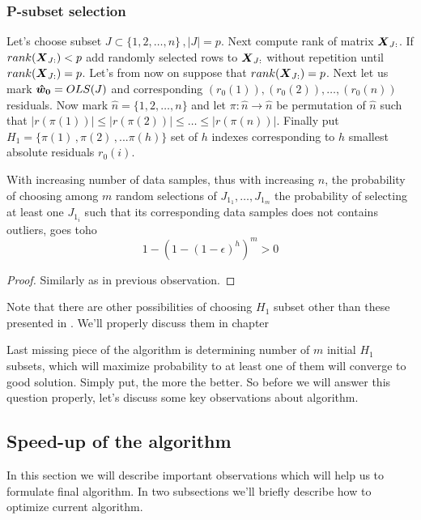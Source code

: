 \subsubsection{P-subset selection}
Let's choose subset $J \subset \{{1,2,\ldots,n\}}\,, |J| = p$. Next compute rank of matrix $\m{X}_{J:}$. If $rank(\m{X}_{J:}) < p$ add randomly selected rows to $\m{X}_{J:}$ without repetition until $rank(\m{X}_{J:}) = p$. Let's from now on suppose that $rank(\m{X}_{J:}) = p$. Next let us mark $\boldsymbol{\hat{w}_0} = OLS(J)$ and corresponding $(r_0(1)), (r_0(2)), \ldots ,(r_0(n))$ residuals.  Now mark $\hat{n} = \{{1,2,\ldots,n\}}$ and let
$\pi: \hat{n} \rightarrow \hat{n}$ be permutation of $\hat{n}$ such that $|r({\pi(1)})| \leq |r({\pi(2)})| \leq \ldots \leq |r({\pi(n)})|$. Finally put $H_1 = \{{\pi(1)\,, \pi(2)\,,... \pi(h)\}}$ set of $h$ indexes corresponding to $h$ smallest absolute residuals $r_0(i)$.

\begin{observation} \label{prandomsamples}
	With increasing number of data samples, thus with increasing $n$, the probability of choosing among $m$ random selections of $J_{1_1}, \ldots ,J_{1_m}$ the probability of selecting
	at least one $J_{1_i}$ such that its corresponding data samples does not contains outliers, goes toho
	$$ 1-(1-(1-\epsilon)^h)^m  > 0$$
\end{observation}

\begin{proof}
	Similarly as in previous observation.
\end{proof}

\begin{itshape}
Note that there are other possibilities of choosing $H_1$ subset other than these presented in \cite{rouss:2000}.
We'll properly discuss them in chapter 
\end{itshape}

Last missing piece of the algorithm is determining number of $m$ initial $H_1$ subsets, which will maximize probability to at least one of them will converge to good solution. Simply put, the more the better. So before we will answer this question properly, let's discuss some key observations about algorithm.


\subsection{Speed-up of the algorithm}
In this section we will describe important observations which will help us to formulate final algorithm. In two subsections we'll briefly describe how to optimize current algorithm. 

